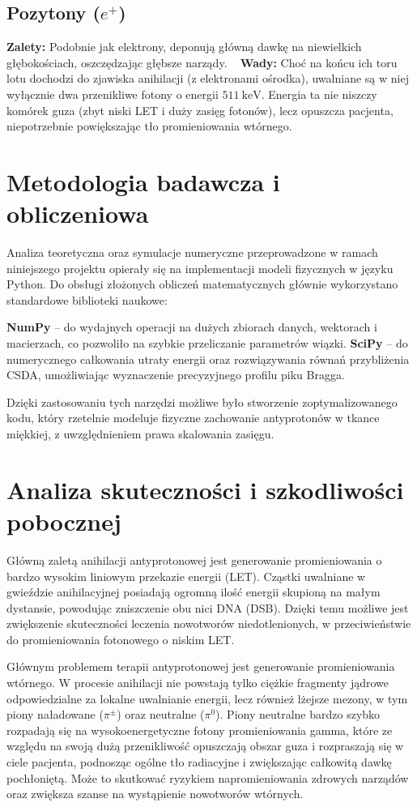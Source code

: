 \documentclass{article}
\begin{document}
\subsection{Pozytony ($e^+$)}
\textbf{Zalety:} Podobnie jak elektrony, deponują główną dawkę na niewielkich głębokościach, oszczędzając głębsze narządy. \
\newline
\textbf{Wady:} Choć na końcu ich toru lotu dochodzi do zjawiska anihilacji (z elektronami ośrodka), uwalniane są w niej wyłącznie dwa przenikliwe fotony o energii $511~\mathrm{keV}$. Energia ta nie niszczy komórek guza (zbyt niski LET i duży zasięg fotonów), lecz opuszcza pacjenta, niepotrzebnie powiększając tło promieniowania wtórnego.

\section{Metodologia badawcza i obliczeniowa}
Analiza teoretyczna oraz symulacje numeryczne przeprowadzone w ramach niniejszego projektu opierały się na implementacji modeli fizycznych w języku Python. Do obsługi złożonych obliczeń matematycznych głównie wykorzystano standardowe biblioteki naukowe:
\begin{itemize}
\textbf{NumPy} -- do wydajnych operacji na dużych zbiorach danych, wektorach i macierzach, co pozwoliło na szybkie przeliczanie parametrów wiązki.
\textbf{SciPy} -- do numerycznego całkowania utraty energii oraz rozwiązywania równań przybliżenia CSDA, umożliwiając wyznaczenie precyzyjnego profilu piku Bragga.
\end{itemize}
Dzięki zastosowaniu tych narzędzi możliwe było stworzenie zoptymalizowanego kodu, który rzetelnie modeluje fizyczne zachowanie antyprotonów w tkance miękkiej, z uwzględnieniem prawa skalowania zasięgu.

\section{Analiza skuteczności i szkodliwości pobocznej}
Główną zaletą anihilacji antyprotonowej jest generowanie promieniowania o bardzo wysokim liniowym przekazie energii (LET). Cząstki uwalniane w gwieździe anihilacyjnej posiadają ogromną ilość energii skupioną na małym dystansie, powodując zniszczenie obu nici DNA (DSB). Dzięki temu możliwe jest zwiększenie skuteczności leczenia nowotworów niedotlenionych, w przeciwieństwie do promieniowania fotonowego o niskim LET.

Głównym problemem terapii antyprotonowej jest generowanie promieniowania wtórnego. W procesie anihilacji nie powstają tylko ciężkie fragmenty jądrowe odpowiedzialne za lokalne uwalnianie energii, lecz również lżejsze mezony, w tym piony naładowane ($\pi^{\pm}$) oraz neutralne ($\pi^0$). Piony neutralne bardzo szybko rozpadają się na wysokoenergetyczne fotony promieniowania gamma, które ze względu na swoją dużą przenikliwość opuszczają obszar guza i rozpraszają się w ciele pacjenta, podnosząc ogólne tło radiacyjne i zwiększając całkowitą dawkę pochłoniętą. Może to skutkować ryzykiem napromieniowania zdrowych narządów oraz zwiększa szanse na wystąpienie nowotworów wtórnych.
\end{document}
